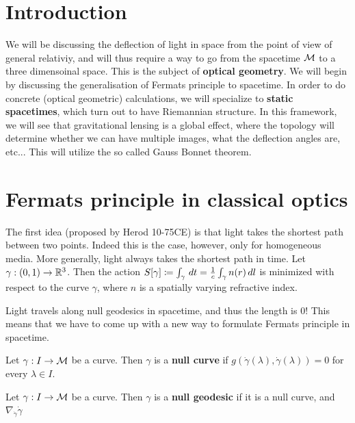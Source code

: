 
\section{Introduction}
We will be discussing the deflection of light in space from the point of view of general relativiy, and will thus require a way to go from the spacetime $\mathcal{M}$ to a three dimensoinal space.
This is the subject of \textbf{optical geometry}.
We will begin by discussing the generalisation of Fermats principle to spacetime. In order to do concrete (optical geometric) calculations, we will specialize to \textbf{static spacetimes}, which turn out to have Riemannian structure.
In this framework, we will see that gravitational lensing is a global effect, where the topology will determine whether we can have multiple images, what the deflection angles are, etc... This will utilize the so called Gauss Bonnet theorem.

\section{Fermats principle in classical optics}
The first idea (proposed by Herod 10-75CE) is that light takes the shortest path between two points.
Indeed this is the case, however, only for homogeneous media.
More generally, light always takes the shortest path in time.
Let $\gamma: (0,1) \to \mathbb{R}^3$.
Then the action $S[\gamma] \coloneqq \int_{\gamma} \, dt = \frac{1}{c}\int_{\gamma} n(r) \, dl$ is minimized with respect to the curve $\gamma$, where $n$ is a spatially varying refractive index.
\begin{remark}[]\label{}
Light travels along null geodesics in spacetime, and thus the length is $0$! This means that we have to come up with a new way to formulate Fermats principle in spacetime.
\end{remark}

\begin{definition}[]\label{}
Let $\gamma: I \to \mathcal{M}$ be a curve. Then $\gamma$ is a \textbf{null curve} if $g(\dot{\gamma}(\lambda), \dot{\gamma}(\lambda))=0$ for every $\lambda \in I$.
\end{definition}
%
\begin{definition}[]\label{}
Let $\gamma: I \to \mathcal{M}$ be a curve. Then $\gamma$ is a \textbf{null geodesic} if it is a null curve, and $\nabla_{\dot{\gamma}} \dot{\gamma}$
\end{definition}


